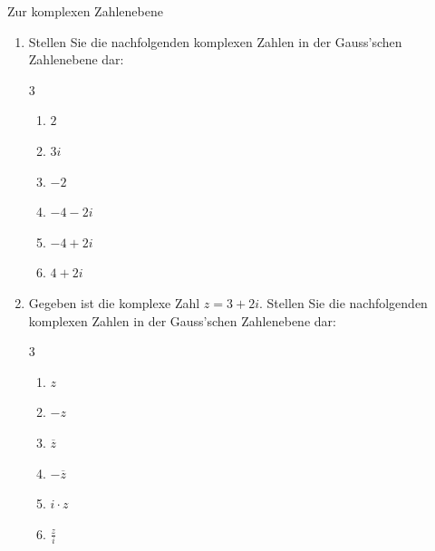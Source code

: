 \clearpage
\begin{ueb}
    {Zur komplexen Zahlenebene}{}
   \begin{enumerate}
    \item Stellen Sie die nachfolgenden komplexen Zahlen in der Gauss'schen Zahlenebene dar:
    \begin{multicols}{3}
    \begin{enumerate}
        \item $2$
        \item $3i$
        \item $-2$
        \item $-4-2i$
        \item $-4+2i$
        \item $4+2i$
    \end{enumerate}
\end{multicols}
    \begin{center}
        
        \end{center}
    \item     Gegeben ist die komplexe Zahl $z=3+2i$. Stellen Sie die nachfolgenden komplexen Zahlen in der Gauss'schen Zahlenebene dar:
        \begin{multicols}{3}
        \begin{enumerate}
            \item $z$
            \item $-z$
            \item $\overline{z}$
            \item $-\overline{z}$
            \item $i\cdot z$
            \item $\frac{z}{i}$
        \end{enumerate}
    \end{multicols}
    \begin{center}
        

\end{center}
\end{enumerate}
\end{ueb}
